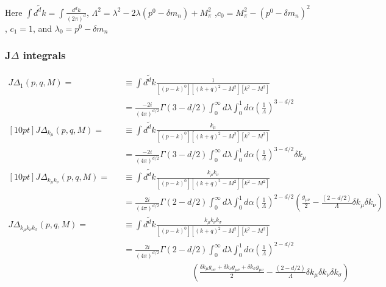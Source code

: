 \documentclass{article}
\newcommand{\bea}{\begin{eqnarray}}
\newcommand{\eea}{\end{eqnarray}}
\begin{document}
Here $ \int \tilde{d^dk} = \int \frac{d^dk}{\left( 2\pi \right)^d }$, $ \Lambda^2= \lambda^2 -2\lambda \left( p^0-\delta m_n \right) + M_\pi ^2$ ,$ c_0= M_\pi^2-\left( p^0-\delta m_n\right)^2 $, $c_1=1$, and $\lambda_0 =p^0-\delta m_n$




\subsubsection{J$\Delta$ integrals}


\bea
	J \Delta_{1} \left(p,q,M  \right)=  && \equiv  \int \tilde{d^dk} \frac{   1    }{ \left[ \left(p-k\right)^0 \right] \left[\left( k+q \right) ^2-M^2 \right]  \left[k^2-M^2 \right] } 
	\nonumber\\
	&& =\frac{-2i  }{\left( 4\pi \right)^{d/2}} \Gamma \left(  3- d/2 \right)\int_{0}^{\infty}d \lambda \int_{0}^{1}d \alpha \left( \frac{1}{\Lambda} \right)^{3-d/2}
	\nonumber
	\nonumber\\	[10pt]
	J \Delta _{ k_\mu} \left(p,q,M  \right)=  && \equiv  \int \tilde{d^dk} \frac{   k_\mu    }{ \left[ \left(p-k\right)^0 \right] \left[\left( k+q \right) ^2-M^2 \right]  \left[k^2-M^2 \right] } 
	\nonumber\\
	&& =\frac{-2i  }{\left( 4\pi \right)^{d/2}} \Gamma \left(  3- d/2 \right)\int_{0}^{\infty}d \lambda \int_{0}^{1}d \alpha \left( \frac{1}{\Lambda} \right)^{3-d/2} \delta k_\mu
	\nonumber
	\nonumber\\	[10pt]
	J \Delta _{ k_\mu k_\nu } \left(p,q,M  \right)=  && \equiv  \int \tilde{d^dk} \frac{   k_\mu k_\nu   }{ \left[ \left(p-k\right)^0 \right] \left[\left( k+q \right) ^2-M^2 \right]  \left[k^2-M^2 \right] } 
	\nonumber\\
	&& =\frac{2i}{\left( 4\pi \right)^{d/2}}  \Gamma \left(  2- d/2 \right) \int_{0}^{\infty}d \lambda \int_{0}^{1}d \alpha \left( \frac{1}{\Lambda} \right)^{2-d/2} \left(  \frac{g_{\mu \nu}}{2} -\frac{\left(2-d/2\right)}{\Lambda}\delta k_\mu \delta k_\nu \right) 
	\nonumber\\
	J \Delta _{ k_\mu k_\nu k_\sigma} \left(p,q,M  \right)=  && \equiv  \int \tilde{d^dk} \frac{   k_\mu k_\nu  k_\sigma }{ \left[ \left(p-k\right)^0 \right] \left[\left( k+q \right) ^2-M^2 \right]  \left[k^2-M^2 \right] } 
	\nonumber\\
	&& =\frac{2i }{\left( 4\pi \right)^{d/2}}  \Gamma \left(  2- d/2 \right)\int_{0}^{\infty}d \lambda \int_{0}^{1}d \alpha \left( \frac{1}{\Lambda} \right)^{2-d/2} 
	\nonumber\\
	&& \qquad \qquad \qquad \qquad \left(  \frac{\delta k_\mu g_{\nu \sigma}+\delta k_\nu g_{\mu \sigma}+\delta k_\sigma g_{\mu \nu}}{2} -
	\frac{\left(2-d/2\right)}{\Lambda}\delta k_\mu \delta k_\nu \delta k_\sigma \right) 
	\nonumber
	\nonumber\	
\eea
\end{document}
